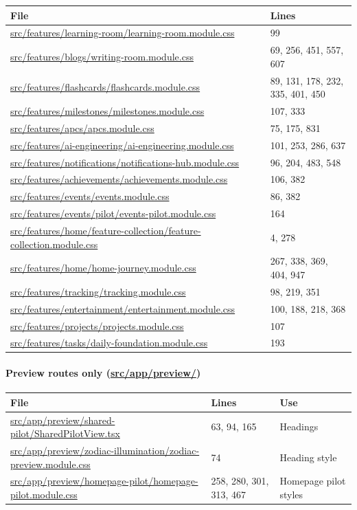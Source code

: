 \documentclass[11pt,a4paper]{article}
\DeclareRobustCommand{\file}[1]{{\ttfamily\small\url{#1}}}
\begin{document}
\begin{longtable}{@{}p{10.2cm}p{4.2cm}@{}}
\toprule
File & Lines \\
\midrule
\endhead
\file{src/features/learning-room/learning-room.module.css} & 99 \\
\file{src/features/blogs/writing-room.module.css} & 69, 256, 451, 557, 607 \\
\file{src/features/flashcards/flashcards.module.css} & 89, 131, 178, 232, 335, 401, 450 \\
\file{src/features/milestones/milestones.module.css} & 107, 333 \\
\file{src/features/apcs/apcs.module.css} & 75, 175, 831 \\
\file{src/features/ai-engineering/ai-engineering.module.css} & 101, 253, 286, 637 \\
\file{src/features/notifications/notifications-hub.module.css} & 96, 204, 483, 548 \\
\file{src/features/achievements/achievements.module.css} & 106, 382 \\
\file{src/features/events/events.module.css} & 86, 382 \\
\file{src/features/events/pilot/events-pilot.module.css} & 164 \\
\file{src/features/home/feature-collection/feature-collection.module.css} & 4, 278 \\
\file{src/features/home/home-journey.module.css} & 267, 338, 369, 404, 947 \\
\file{src/features/tracking/tracking.module.css} & 98, 219, 351 \\
\file{src/features/entertainment/entertainment.module.css} & 100, 188, 218, 368 \\
\file{src/features/projects/projects.module.css} & 107 \\
\file{src/features/tasks/daily-foundation.module.css} & 193 \\
\bottomrule
\end{longtable}

\paragraph{Preview routes only (\file{src/app/preview/})}

\begin{longtable}{@{}p{8.2cm}p{2.6cm}p{3.6cm}@{}}
\toprule
File & Lines & Use \\
\midrule
\endhead
\file{src/app/preview/shared-pilot/SharedPilotView.tsx} & 63, 94, 165 & Headings \\
\file{src/app/preview/zodiac-illumination/zodiac-preview.module.css} & 74 & Heading style \\
\file{src/app/preview/homepage-pilot/homepage-pilot.module.css} & 258, 280, 301, 313, 467 & Homepage pilot styles \\
\bottomrule
\end{longtable}
\end{document}
